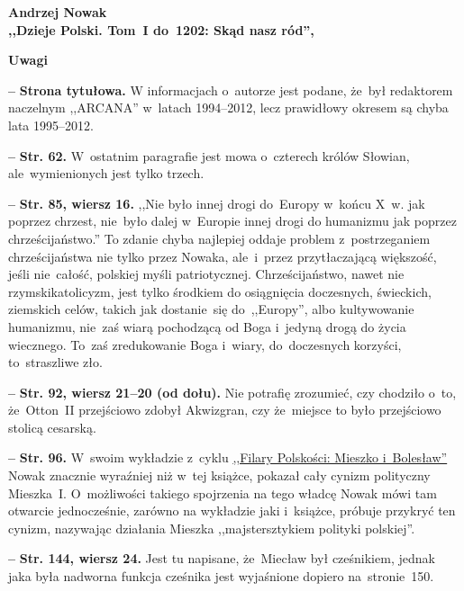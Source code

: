 \documentclass[a4paper,11pt]{article}
\newcommand{\spaceFour}{0.5em}
\newcommand{\tb}{\textbf}
\newcommand{\noi}{\noindent}
\newcommand{\start}{\noi \tb{--} {}}
\newcommand{\Center}[1]{\begin{center} #1 \end{center}}
\newcommand{\CenterTB}[1]{\Center{\tb{#1}}}
\newcommand{\Str}[1]{\tb{Str. #1.}}
\newcommand{\StrWg}[2]{\tb{Str. #1, wiersz #2.}}
\newcommand{\StrWd}[2]{\tb{Str. #1, wiersz #2 (od dołu).}}
\newcommand{\Work}[1]{ \begin{center} {\large \tb{#1}} \end{center} }
\begin{document}
\Work{
  Andrzej Nowak \\
  ,,Dzieje Polski. Tom~I do~1202: Skąd nasz ród'',
  \cite{NowakDziejePolskivI14a} }


\CenterTB{Uwagi}

\start \tb{Strona tytułowa.} W informacjach o~autorze jest podane,
że~był redaktorem naczelnym ,,ARCANA'' w~latach 1994--2012, lecz
prawidłowy okresem są chyba lata 1995--2012.

\vspace{\spaceFour}


\start \Str{62} W~ostatnim paragrafie jest mowa o~czterech królów
Słowian, ale~wymienionych jest tylko trzech.

\vspace{\spaceFour}

\start \StrWg{85}{16} ,,Nie było innej drogi do~Europy w~końcu X~w.
jak poprzez chrzest, nie~było dalej w~Europie innej drogi do humanizmu
jak poprzez chrześcijaństwo.'' To zdanie chyba najlepiej oddaje
problem z~postrzeganiem chrześcijaństwa nie tylko przez Nowaka,
ale~i~przez przytłaczającą większość, jeśli nie~całość, polskiej myśli
patriotycznej. Chrześcijaństwo, nawet nie rzymski\dywiz katolicyzm,
jest tylko środkiem do osiągnięcia doczesnych, świeckich, ziemskich
celów, takich jak dostanie~się do~,,Europy'', albo kultywowanie
humanizmu, nie~zaś wiarą pochodzącą od Boga i~jedyną drogą do życia
wiecznego. To~zaś zredukowanie Boga i~wiary, do~doczesnych korzyści,
to~straszliwe zło.

\vspace{\spaceFour}


\start \StrWd{92}{21--20} Nie potrafię zrozumieć, czy chodziło o~to,
że~Otton~II przejściowo zdobył Akwizgran, czy że~miejsce to było
przejściowo stolicą cesarską.

\vspace{\spaceFour}


\start \Str{96} W~swoim wykładzie z~cyklu
\href{https://www.youtube.com/watch?v=QovVLT2fitc}{,,Filary Polskości:
  Mieszko i~Bolesław''} Nowak znacznie wyraźniej niż w~tej książce,
pokazał cały cynizm polityczny Mieszka~I. O~możliwości takiego
spojrzenia na tego władcę Nowak mówi tam otwarcie jednocześnie,
zarówno na wykładzie jaki i~książce, próbuje przykryć ten cynizm,
nazywając działania Mieszka ,,majstersztykiem polityki polskiej''.

\vspace{\spaceFour}


\start \StrWg{144}{24} Jest tu napisane, że~Miecław był cześnikiem,
jednak jaka była nadworna funkcja cześnika jest wyjaśnione dopiero
na~stronie~150.
\end{document}
